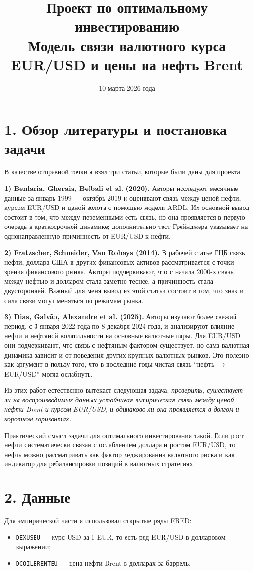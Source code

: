 \documentclass[a4paper,12pt]{article}
\title{Проект по оптимальному инвестированию\\[0.3em]
\large Модель связи валютного курса EUR/USD и цены на нефть Brent}
\author{}
\date{10 марта 2026 года}
\begin{document}
\maketitle

\section*{1. Обзор литературы и постановка задачи}
В качестве отправной точки я взял три статьи, которые были даны для проекта.

\textbf{1) Benlaria, Gheraia, Belbali et al. (2020).}
Авторы исследуют месячные данные за январь 1999 --- октябрь 2019 и оценивают связь между ценой нефти, курсом EUR/USD и ценой золота с помощью модели ARDL. Их основной вывод состоит в том, что между переменными есть связь, но она проявляется в первую очередь в краткосрочной динамике; дополнительно тест Грейнджера указывает на однонаправленную причинность от EUR/USD к нефти.

\textbf{2) Fratzscher, Schneider, Van Robays (2014).}
В рабочей статье ЕЦБ связь нефти, доллара США и других финансовых активов рассматривается с точки зрения финансового рынка. Авторы подчеркивают, что с начала 2000-х связь между нефтью и долларом стала заметно теснее, а причинность стала двусторонней. Важный для меня вывод из этой статьи состоит в том, что знак и сила связи могут меняться по режимам рынка.

\textbf{3) Dias, Galv\~ao, Alexandre et al. (2025).}
Авторы изучают более свежий период, с 3 января 2022 года по 8 декабря 2024 года, и анализируют влияние нефти и нефтяной волатильности на основные валютные пары. Для EUR/USD они подчеркивают, что связь с нефтяным фактором существует, но сама валютная динамика зависит и от поведения других крупных валютных рынков. Это полезно как аргумент в пользу того, что в последние годы чистая связь ``нефть $\to$ EUR/USD'' могла ослабнуть.

Из этих работ естественно вытекает следующая задача: \textit{проверить, существует ли на воспроизводимых данных устойчивая эмпирическая связь между ценой нефти Brent и курсом EUR/USD, и одинаково ли она проявляется в долгом и коротком горизонтах.}

Практический смысл задачи для оптимального инвестирования такой. Если рост нефти систематически связан с ослаблением доллара и ростом EUR/USD, то нефть можно рассматривать как фактор хеджирования валютного риска и как индикатор для ребалансировки позиций в валютных стратегиях.

\section*{2. Данные}
Для эмпирической части я использовал открытые ряды FRED:
\begin{itemize}
    \item \texttt{DEXUSEU} --- курс USD за 1 EUR, то есть ряд EUR/USD в долларовом выражении;
    \item \texttt{DCOILBRENTEU} --- цена нефти Brent в долларах за баррель.
\end{itemize}
\end{document}
